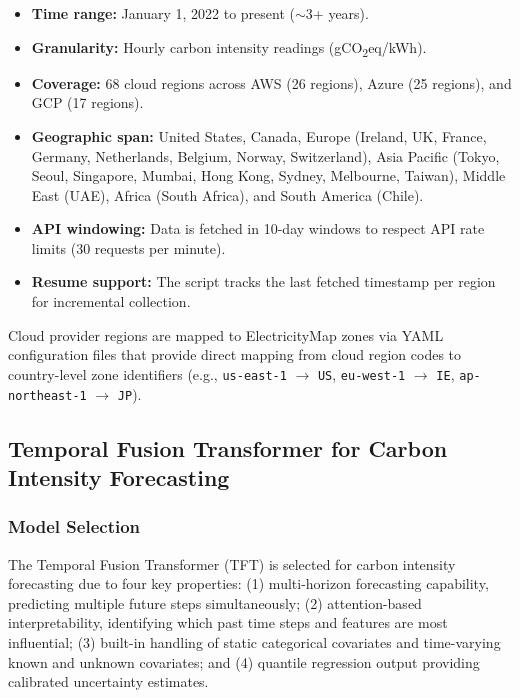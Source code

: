 \documentclass[conference]{IEEEtran}
\begin{document}
\begin{itemize}
    \item \textbf{Time range:} January 1, 2022 to present ($\sim$3+ years).
    \item \textbf{Granularity:} Hourly carbon intensity readings (gCO\textsubscript{2}eq/kWh).
    \item \textbf{Coverage:} 68 cloud regions across AWS (26 regions), Azure (25 regions), and GCP (17 regions).
    \item \textbf{Geographic span:} United States, Canada, Europe (Ireland, UK, France, Germany, Netherlands, Belgium, Norway, Switzerland), Asia Pacific (Tokyo, Seoul, Singapore, Mumbai, Hong Kong, Sydney, Melbourne, Taiwan), Middle East (UAE), Africa (South Africa), and South America (Chile).
    \item \textbf{API windowing:} Data is fetched in 10-day windows to respect API rate limits (30 requests per minute).
    \item \textbf{Resume support:} The script tracks the last fetched timestamp per region for incremental collection.
\end{itemize}

Cloud provider regions are mapped to ElectricityMap zones via YAML configuration files that provide direct mapping from cloud region codes to country-level zone identifiers (e.g., \texttt{us-east-1} $\rightarrow$ \texttt{US}, \texttt{eu-west-1} $\rightarrow$ \texttt{IE}, \texttt{ap-northeast-1} $\rightarrow$ \texttt{JP}).

\subsection{Temporal Fusion Transformer for Carbon Intensity Forecasting}

\subsubsection{Model Selection}

The Temporal Fusion Transformer (TFT) \cite{b15} is selected for carbon intensity forecasting due to four key properties: (1) multi-horizon forecasting capability, predicting multiple future steps simultaneously; (2) attention-based interpretability, identifying which past time steps and features are most influential; (3) built-in handling of static categorical covariates and time-varying known and unknown covariates; and (4) quantile regression output providing calibrated uncertainty estimates.
\end{document}
